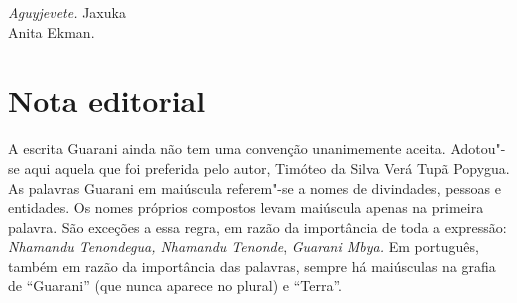 \medskip{} 

\hfill \emph{Aguyjevete.}
Jaxuka\tabularnewline
\\Anita Ekman.

 

 

\section{Nota editorial}

A escrita Guarani ainda não tem uma convenção unanimemente aceita.
Adotou"-se aqui aquela que foi preferida pelo autor, Timóteo da Silva
Verá Tupã Popygua. As palavras Guarani em maiúscula referem"-se a nomes
de divindades, pessoas e entidades. Os nomes próprios compostos levam
maiúscula apenas na primeira palavra. São exceções a essa regra, em
razão da importância de toda a expressão: \emph{Nhamandu Tenondegua,
Nhamandu Tenonde}, \emph{Guarani Mbya.} Em português, também em razão da
importância das palavras, sempre há maiúsculas na grafia de ``Guarani''
(que nunca aparece no plural) e ``Terra''.
